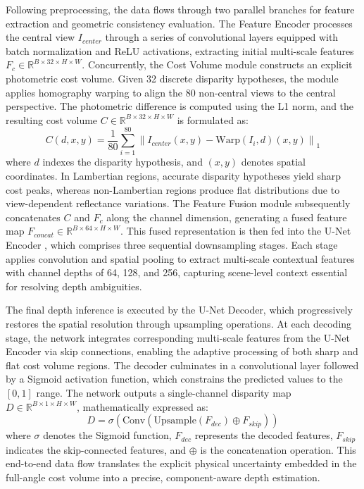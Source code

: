 \documentclass[lettersize,journal]{IEEEtran}
\begin{document}
Following preprocessing, the data flows through two parallel branches for feature extraction and geometric consistency evaluation. The Feature Encoder processes the central view $I_{center}$ through a series of convolutional layers equipped with batch normalization and ReLU activations, extracting initial multi-scale features $F_c \in \mathbb{R}^{B \times 32 \times H \times W}$. Concurrently, the Cost Volume module constructs an explicit photometric cost volume. Given 32 discrete disparity hypotheses, the module applies homography warping to align the 80 non-central views to the central perspective. The photometric difference is computed using the L1 norm, and the resulting cost volume $C \in \mathbb{R}^{B \times 32 \times H \times W}$ is formulated as:
\begin{equation}
C(d, x, y) = \frac{1}{80} \sum_{i=1}^{80} \left\| I_{center}(x,y) - \text{Warp}(I_i, d)(x,y) \right\|_1
\end{equation}
where $d$ indexes the disparity hypothesis, and $(x,y)$ denotes spatial coordinates. In Lambertian regions, accurate disparity hypotheses yield sharp cost peaks, whereas non-Lambertian regions produce flat distributions due to view-dependent reflectance variations. The Feature Fusion module subsequently concatenates $C$ and $F_c$ along the channel dimension, generating a fused feature map $F_{concat} \in \mathbb{R}^{B \times 64 \times H \times W}$. This fused representation is then fed into the U-Net Encoder \cite{ronneberger2015}, which comprises three sequential downsampling stages. Each stage applies convolution and spatial pooling to extract multi-scale contextual features with channel depths of 64, 128, and 256, capturing scene-level context essential for resolving depth ambiguities.

The final depth inference is executed by the U-Net Decoder, which progressively restores the spatial resolution through upsampling operations. At each decoding stage, the network integrates corresponding multi-scale features from the U-Net Encoder via skip connections, enabling the adaptive processing of both sharp and flat cost volume regions. The decoder culminates in a convolutional layer followed by a Sigmoid activation function, which constrains the predicted values to the $[0, 1]$ range. The network outputs a single-channel disparity map $D \in \mathbb{R}^{B \times 1 \times H \times W}$, mathematically expressed as:
\begin{equation}
D = \sigma \left( \text{Conv} \left( \text{Upsample}(F_{dec}) \oplus F_{skip} \right) \right)
\end{equation}
where $\sigma$ denotes the Sigmoid function, $F_{dec}$ represents the decoded features, $F_{skip}$ indicates the skip-connected features, and $\oplus$ is the concatenation operation. This end-to-end data flow translates the explicit physical uncertainty embedded in the full-angle cost volume into a precise, component-aware depth estimation.
\end{document}
